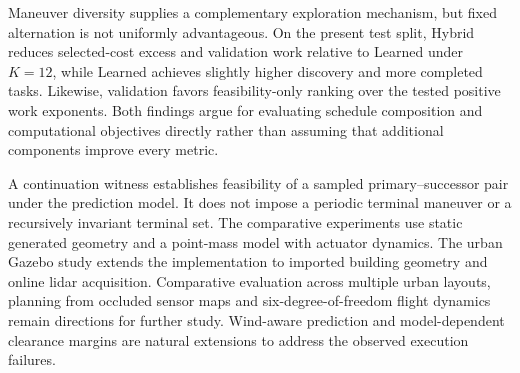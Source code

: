Maneuver diversity supplies a complementary exploration mechanism, but fixed alternation is not uniformly advantageous. On the present test split, Hybrid reduces selected-cost excess and validation work relative to Learned under $K=12$, while Learned achieves slightly higher discovery and more completed tasks. Likewise, validation favors feasibility-only ranking over the tested positive work exponents. Both findings argue for evaluating schedule composition and computational objectives directly rather than assuming that additional components improve every metric.

A continuation witness establishes feasibility of a sampled primary--successor pair under the prediction model. It does not impose a periodic terminal maneuver or a recursively invariant terminal set. The comparative experiments use static generated geometry and a point-mass model with actuator dynamics. The urban Gazebo study extends the implementation to imported building geometry and online lidar acquisition. Comparative evaluation across multiple urban layouts, planning from occluded sensor maps and six-degree-of-freedom flight dynamics remain directions for further study. Wind-aware prediction and model-dependent clearance margins are natural extensions to address the observed execution failures.
